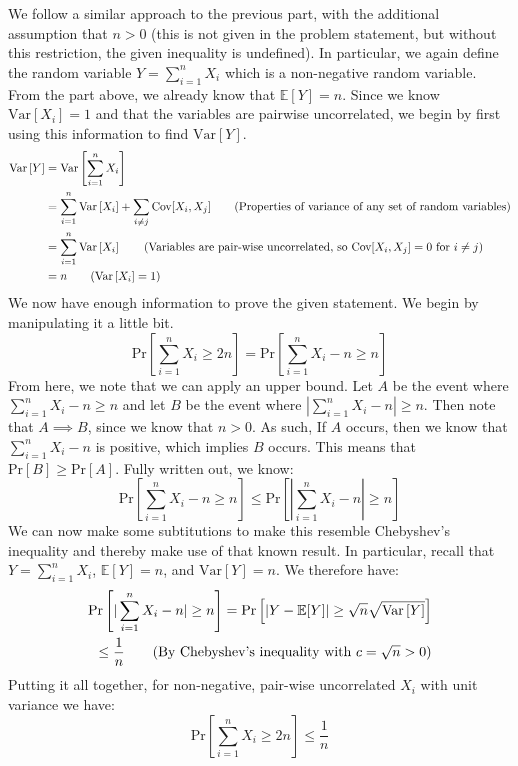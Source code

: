 \documentclass[12pt]{exam}
\newcommand*{\ex}{\mathbb{E}}
\newcommand*{\prob}[1]{\text{Pr} \left[ #1 \right]}
\newcommand*{\var}[1]{\text{Var} \left[ #1 \right]}
\begin{document}
\begin{questions}
\begin{parts}
\begin{solution}
We follow a similar approach to the previous part, with the additional assumption that $n > 0$ (this is not given in the problem statement, but without this restriction, the given inequality is undefined). In particular, we again define the random variable $Y = \sum_{i=1}^{n} X_i$ which is a non-negative random variable. From the part above, we already know that $\ex[Y] = n$. Since we know $\var{X_i} = 1$ and that the variables are pairwise uncorrelated, we begin by first using this information to find $\var{Y}$.
\begin{align*}
  \var{Y} &= \var{\sum_{i=1}^n X_i} \\
  &= \sum_{i=1}^n \var{X_i} + \sum_{i \neq j} \text{Cov}[X_i, X_j] \tag{Properties of variance of any set of random variables} \\
  &=  \sum_{i=1}^n \var{X_i} \tag{Variables are pair-wise uncorrelated, so $\text{Cov}[X_i, X_j] = 0$ for $i \neq j$} \\
  &= n \tag{$\var{X_i} = 1$}
\end{align*}
We now have enough information to prove the given statement. We begin by manipulating it a little bit.
$$
 \prob{\sum_{i=1}^n X_i \geq 2n} = \prob{\sum_{i=1}^n X_i - n \geq n}
$$
From here, we note that we can apply an upper bound. Let $A$ be the event where $\sum_{i=1}^n X_i - n \geq n$ and let $B$ be the event where $|\sum_{i=1}^n X_i - n| \geq n$. Then note that $A \implies B$, since we know that $n > 0$. As such, If $A$ occurs, then we know that $\sum_{i=1}^n X_i - n$ is positive, which implies $B$ occurs. This means that $\prob{B} \geq \prob{A}$. Fully written out, we know:
$$
\prob{\sum_{i=1}^n X_i - n \geq n} \leq \prob{|\sum_{i=1}^n X_i - n| \geq n}
$$
We can now make some subtitutions to make this resemble Chebyshev's inequality and thereby make use of that known result. In particular, recall that $Y = \sum_{i=1}^n X_i$, $\ex[Y] = n$, and $\var{Y} = n$. We therefore have:
\begin{align*}
\prob{|\sum_{i=1}^n X_i - n| \geq n} = \prob{|Y - \ex[Y]| \geq \sqrt{n}\sqrt{\var{Y}}} \\
\leq \frac{1}{n} \tag{By Chebyshev's inequality with $c = \sqrt{n} > 0$}
\end{align*}
Putting it all together, for non-negative, pair-wise uncorrelated $X_i$ with unit variance we have:
$$
\prob{\sum_{i=1}^n X_i \geq 2n} \leq \frac{1}{n}
$$
\end{solution}



\end{parts}
\end{questions}
\end{document}
